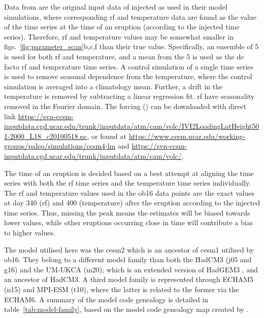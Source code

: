 \documentclass{ametsocV6.1}
\newcommand{\iso}[1][i]{{#1}njected \ce{SO2}}
\begin{document}
\appendix[B]

\label{ap:ob16}

Data from \citet{ottobliesner2016} are the original input data of \iso{} as used in
their model simulations, where corresponding \gls{rf} and temperature data are found as
the value of the time series at the time of an eruption (according to the \iso{} time
series). Therefore, \gls{rf} and temperature values may be somewhat smaller in
figs.~\ref{fig:parameter_scan}b,c,f than their true value. Specifically, an ensemble of
5 is used for both \gls{rf} and temperature, and a mean from the 5 is used as the de
facto \gls{rf} and temperature time series. A control simulation of a single time series
is used to remove seasonal dependence from the temperature, where the control simulation
is averaged into a climatology mean. Further, a drift in the temperature is removed by
subtracting a linear regression fit. \gls{rf} have seasonality removed in the Fourier
domain. The forcing () can be downloaded with direct link
\url{https://svn-ccsm-inputdata.cgd.ucar.edu/trunk/inputdata/atm/cam/volc/IVI2LoadingLatHeight501-2000_L18_c20100518.nc},
or found at \url{https://www.cesm.ucar.edu/working-groups/paleo/simulations/ccsm4-lm}
and \url{https://svn-ccsm-inputdata.cgd.ucar.edu/trunk/inputdata/atm/cam/volc/}.

The time of an eruption is decided based on a best attempt at aligning the  time
series with both the \gls{rf} time series and the temperature time series individually.
The \gls{rf} and temperature values used in the \gls{ob16} data points are the exact
values at day 340 (\gls{rf}) and 400 (temperature) after the eruption according to the
\iso{} time series. Thus, missing the peak means the estimates will be biased towards
lower values, while other eruptions occurring close in time will contribute a bias to
higher values.

\appendix[C]


The model utilised here was the \gls{cesm2} which is an ancestor of \gls{cesm1} utilised
by \gls{ob16}. They belong to a different model family than both the HadCM3 (\gls{j05}
and \gls{g16}) and the UM-UKCA (\gls{m20}), which is an extended version of HadGEM3
\citep{dhomse2014}, and an ancestor of HadCM3. A third model family is represented
through ECHAM5 (\gls{n15}) and MPI-ESM (\gls{t10}), where the latter is related to the
former via the ECHAM6. A summary of the model code genealogy is detailed in
table~\ref{tab:model-family}, based on the model code genealogy map created by
\citet{kuma2023}.
\end{document}
